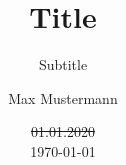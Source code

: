 \author{Max Mustermann}
\titlehead{titlehead}
\subject{Subject}
\title{Title}
\subtitle{Subtitle}
\date{\st{01.01.2020}\\\today}
